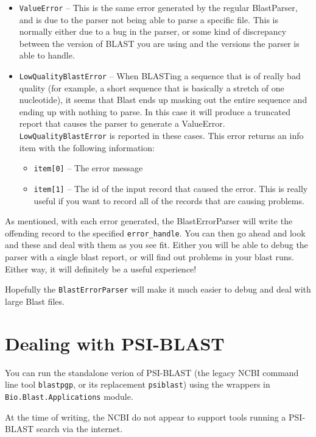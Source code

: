 \documentclass{report}
\begin{document}
\begin{itemize}
  \item \verb|ValueError| -- This is the same error generated by the regular BlastParser, and is due to the parser not being able to parse a specific file. This is normally either due to a bug in the parser, or some kind of discrepancy between the version of BLAST you are using and the versions the parser is able to handle.

  \item \verb|LowQualityBlastError| -- When BLASTing a sequence that is of really bad quality (for example, a short sequence that is basically a stretch of one nucleotide), it seems that Blast ends up masking out the entire sequence and ending up with nothing to parse. In this case it will produce a truncated report that causes the parser to generate a ValueError. \verb|LowQualityBlastError| is reported in these cases. This error returns an info item with the following information:
  \begin{itemize}
    \item \verb|item[0]| -- The error message
    \item \verb|item[1]| -- The id of the input record that caused the error. This is really useful if you want to record all of the records that are causing problems.
  \end{itemize}
\end{itemize}

As mentioned, with each error generated, the BlastErrorParser will write the offending record to the specified \verb|error_handle|. You can then go ahead and look and these and deal with them as you see fit. Either you will be able to debug the parser with a single blast report, or will find out problems in your blast runs. Either way, it will definitely be a useful experience!

Hopefully the \verb|BlastErrorParser| will make it much easier to debug and deal with large Blast files.

\section{Dealing with PSI-BLAST}

You can run the standalone verion of PSI-BLAST (the legacy NCBI command line
tool \verb|blastpgp|, or its replacement \verb|psiblast|) using the wrappers
in \verb|Bio.Blast.Applications| module.

At the time of writing, the NCBI do not appear to support tools running a
PSI-BLAST search via the internet.
\end{document}
